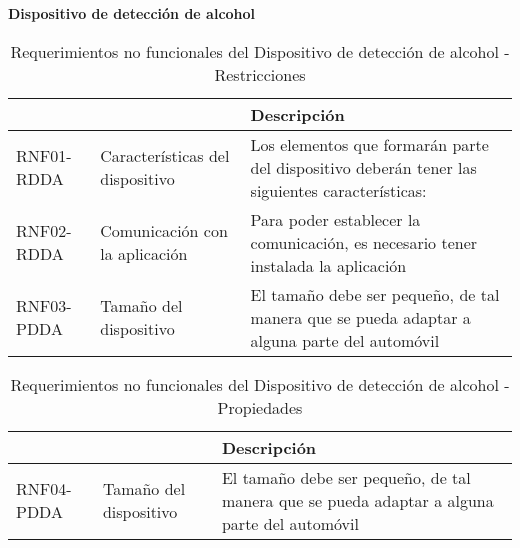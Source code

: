 \textbf{Dispositivo de detección de alcohol}
\begin{center}
\begin{table}[!htb]
\centering
\begin{tabular}{|p{4cm}|p{4cm}|p{5cm}|}
    \hline
    \centering {\bfseries }  & \centering {\bfseries Nombre} & {\bfseries Descripción} \\ \hline
    \centering RNF01-RDDA & \centering Características del dispositivo & Los elementos que formarán parte del dispositivo deberán tener las siguientes características: \\ \hline
    \centering RNF02-RDDA & \centering Comunicación con la aplicación & Para poder establecer la comunicación, es necesario tener instalada la aplicación \\ \hline
    \centering RNF03-PDDA & \centering Tamaño del dispositivo & El tamaño debe ser pequeño, de tal manera que se pueda adaptar a alguna parte del automóvil \\ \hline
\end{tabular}
\caption{Requerimientos no funcionales del Dispositivo de detección de alcohol - Restricciones}
\label{tab:rnfr_dda}
\end{table}
\end{center}

\begin{center}
\begin{table}[!htb]
\centering
\begin{tabular}{|p{4cm}|p{4cm}|p{5cm}|}
    \hline
    \centering {\bfseries }  & \centering {\bfseries Nombre} & {\bfseries Descripción} \\ \hline
    \centering RNF04-PDDA & \centering Tamaño del dispositivo & El tamaño debe ser pequeño, de tal manera que se pueda adaptar a alguna parte del automóvil \\ \hline
\end{tabular}
\caption{Requerimientos no funcionales del Dispositivo de detección de alcohol - Propiedades}
\label{tab:rnfp_dda}
\end{table}
\end{center}
